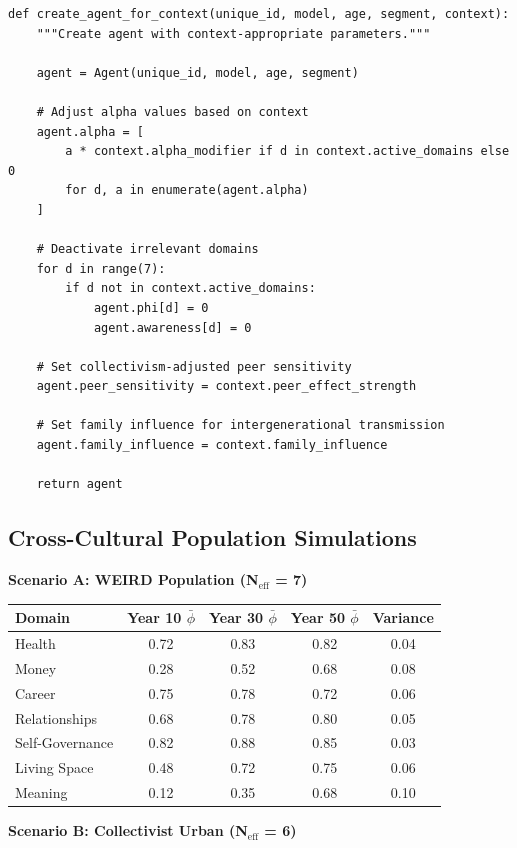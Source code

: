 \begin{verbatim}
def create_agent_for_context(unique_id, model, age, segment, context):
    """Create agent with context-appropriate parameters."""

    agent = Agent(unique_id, model, age, segment)

    # Adjust alpha values based on context
    agent.alpha = [
        a * context.alpha_modifier if d in context.active_domains else 0
        for d, a in enumerate(agent.alpha)
    ]

    # Deactivate irrelevant domains
    for d in range(7):
        if d not in context.active_domains:
            agent.phi[d] = 0
            agent.awareness[d] = 0

    # Set collectivism-adjusted peer sensitivity
    agent.peer_sensitivity = context.peer_effect_strength

    # Set family influence for intergenerational transmission
    agent.family_influence = context.family_influence

    return agent
\end{verbatim}

\subsection{Cross-Cultural Population Simulations}

\textbf{Scenario A: WEIRD Population (N$_{\text{eff}}$ = 7)}

\begin{center}
\small
\begin{tabular}{@{}lcccc@{}}
\toprule
\textbf{Domain} & \textbf{Year 10 $\bar{\phi}$} & \textbf{Year 30 $\bar{\phi}$} & \textbf{Year 50 $\bar{\phi}$} & \textbf{Variance} \\
\midrule
Health & 0.72 & 0.83 & 0.82 & 0.04 \\
Money & 0.28 & 0.52 & 0.68 & 0.08 \\
Career & 0.75 & 0.78 & 0.72 & 0.06 \\
Relationships & 0.68 & 0.78 & 0.80 & 0.05 \\
Self-Governance & 0.82 & 0.88 & 0.85 & 0.03 \\
Living Space & 0.48 & 0.72 & 0.75 & 0.06 \\
Meaning & 0.12 & 0.35 & 0.68 & 0.10 \\
\bottomrule
\end{tabular}
\end{center}

\textbf{Scenario B: Collectivist Urban (N$_{\text{eff}}$ = 6)}

